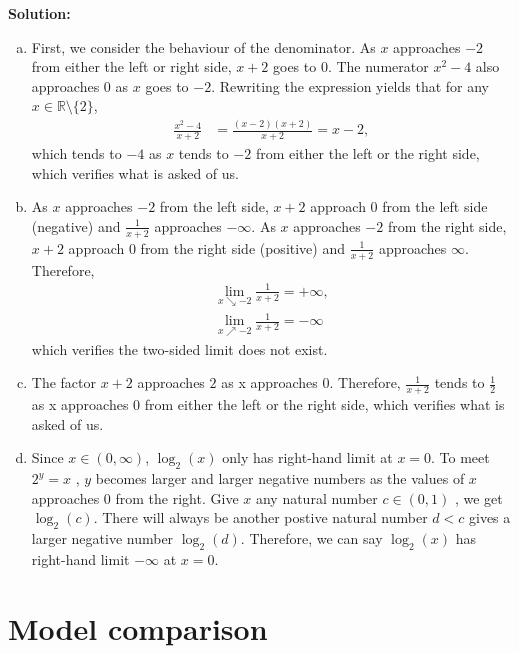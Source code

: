 \documentclass[11pt,a4paper]{article}
\begin{document}
\noindent\textbf{\textbf{Solution:}}\\
\begin{enumerate}[a)]
	\item First, we consider the behaviour of the denominator. As $x$ approaches $-2$ from either the left or right side, $x + 2$ goes to $0$. The numerator $x^2 - 4$ also approaches $0$ as $x$ goes to $-2$. Rewriting the expression yields that for any $x \in \mathbb{R} \setminus \{2\}$,
	\begin{align*}
		\frac{x^2 - 4}{x+2} &= \frac{(x-2)(x+2)}{x+2} =x - 2,
	\end{align*}
	which tends to $-4$ as $x$ tends to $-2$ from either the left or the right side, which verifies what is asked of us.
	
	\item As $x$ approaches $-2$ from the left side, $x + 2$ approach $0$ from the left side (negative) and $\frac{1}{x + 2}$ approaches  $-\infty$.  As $x$ approaches $-2$ from the right side, $x + 2$ approach $0$ from the right side (positive) and $\frac{1}{x + 2} $ approaches  $\infty$. Therefore, 
	\begin{align*}
		\underset{x \searrow -2}{\lim} \frac{1}{x + 2} = +\infty,\\
		\underset{x \nearrow -2}{\lim} \frac{1}{x + 2} =- \infty
	\end{align*}
	which verifies the two-sided limit does not exist.
	
	\item The factor $x + 2$ approaches $2$ as x approaches $0$. Therefore, $ \frac{1}{x + 2}$ tends to $ \frac{1}{2}$  as x approaches $0$ from either the left or the right side, which verifies what is asked of us.
	
	\item Since $x \in (0, \infty)$, $\log_2 (x)$ only has right-hand limit at $x=0$. To meet $2^y = x$ , $y$ becomes larger and larger negative numbers as the values of $x$ approaches $0$ from the right. Give $x$ any natural number $c \in (0,1)$ , we get $\log_2 (c)$. There will always be another postive natural number $d < c$ gives a larger negative number $\log_2 (d)$. Therefore, we can say $\log_2 (x)$ has right-hand limit $-\infty$ at $x=0$.
\end{enumerate}


\section*{Model comparison}
\end{document}
